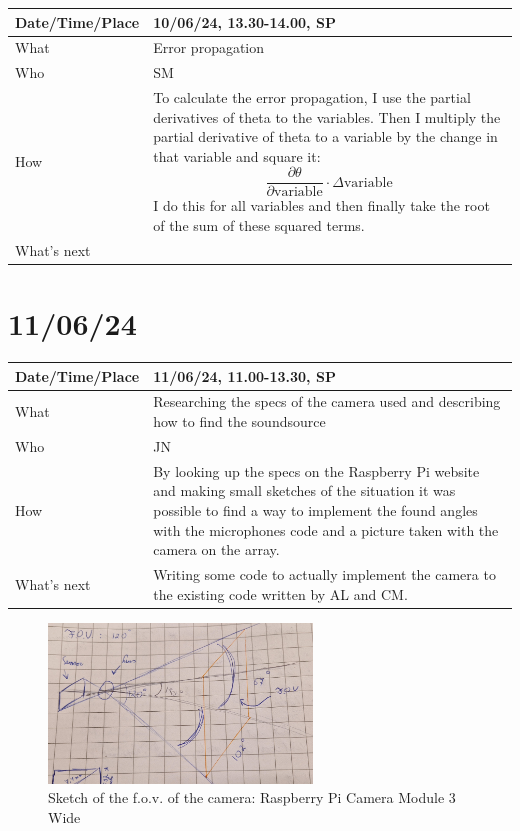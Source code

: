 \documentclass{article}
\begin{document}
\begin{table}[H]
\begin{tabular}{|p{1.5in}|p{4in}|}
\hline
Date/Time/Place &  10/06/24, 13.30-14.00, SP\\ \hline
What            &  Error propagation\\ \hline
Who             &  SM\\ \hline
How             &   To calculate the error propagation, I use the partial derivatives of theta to the variables. Then I multiply the partial derivative of theta to a variable by the change in that variable and square it: $$\frac{\partial\theta}{\partial \text{variable}}\cdot\Delta\text{variable}$$ I do this for all variables and then finally take the root of the sum of these squared terms.\\ \hline
What's next     &  \\ \hline
\end{tabular}
\end{table}

\section{11/06/24}

\begin{table}[H]
\begin{tabular}{|p{1.5in}|p{4in}|}
\hline
Date/Time/Place &  11/06/24, 11.00-13.30, SP\\ \hline
What            &  Researching the specs of the camera used and describing how to find the soundsource\\ \hline
Who             &  JN\\ \hline
How             &  By looking up the specs on the Raspberry Pi website and making small sketches of the situation it was possible to find a way to implement the found angles with the microphones code and a picture taken with the camera on the array. \\ \hline
What's next     &  Writing some code to actually implement the camera to the existing code written by AL and CM.\\ \hline
\end{tabular}
\end{table}

\begin{figure}[H]
    \centering
    \includegraphics[width=7cm]{Foto tekening sensor en F.O.V..jpg}
    \caption{Sketch of the f.o.v. of the camera: Raspberry Pi Camera Module 3 Wide}   
\end{figure}
\end{document}
